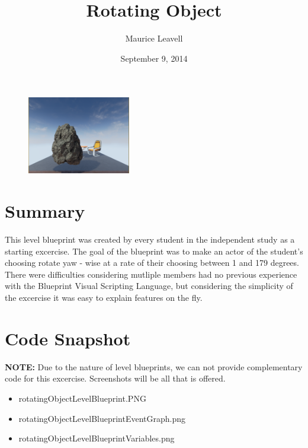 \documentclass[a4paper]{article}
\title{Rotating Object}
\author{Maurice Leavell}
\date{September 9, 2014}
\begin{document}
\begin{figure}
\centering
\includegraphics[width=0.4\textwidth]{rotating_Object.png}
\end{figure}

\maketitle

\section{Summary}

This level blueprint was created by every student in the independent study as a starting excercise. The goal of the blueprint was to make an actor of the student's choosing rotate yaw - wise at a rate of their choosing between 1 and 179 degrees. There were difficulties considering mutliple members had no previous experience with the Blueprint Visual Scripting Language, but considering the simplicity of the excercise it was easy to explain features on the fly.

\section{Code Snapshot}

\textbf{NOTE:} Due to the nature of level blueprints, we can not provide complementary code for this excercise. Screenshots will be all that is offered.

\begin{itemize}
\item rotatingObjectLevelBlueprint.PNG
\item rotatingObjectLevelBlueprintEventGraph.png
\item rotatingObjectLevelBlueprintVariables.png
\end{itemize}
\end{document}
